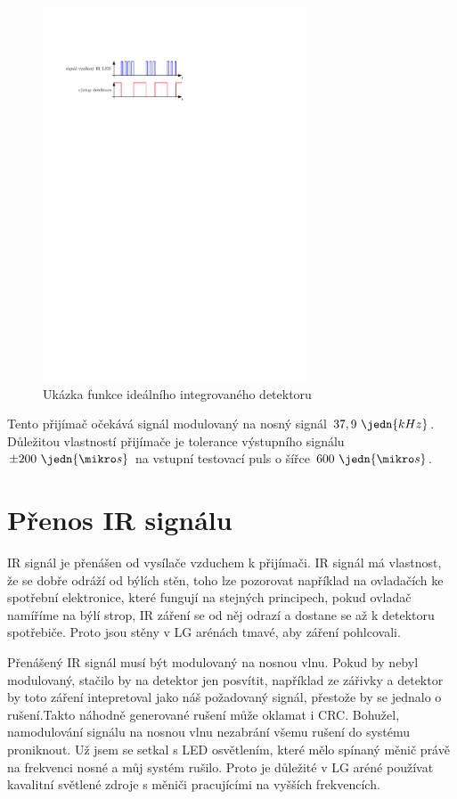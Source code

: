 \begin{figure}[H]
    \begin{center}
        \includegraphics[width=0.7\textwidth]{img/funkce-ir-detektoru}
    \end{center}
    \caption{Ukázka funkce ideálního integrovaného detektoru}
\end{figure}

Tento přijímač očekává signál modulovaný na nosný signál $37,9~\jedn{kHz}$. Důležitou vlastností přijímače je tolerance výstupního signálu $\pm 200~\jedn{\mikro s}$ na vstupní testovací puls o šířce $600~\jedn{\mikro s}$.

\section{Přenos IR signálu}
IR signál je přenášen od vysílače vzduchem k přijímači. IR signál má vlastnost, že se dobře odráží od býlích stěn, toho lze pozorovat například na ovladačích ke spotřební elektronice, které fungují na stejných principech, pokud ovladač namíříme na býlí strop, IR záření se od něj odrazí a dostane se až k detektoru spotřebiče. Proto jsou stěny v LG arénách tmavé, aby záření pohlcovali.

Přenášený IR signál musí být modulovaný na nosnou vlnu. Pokud by nebyl modulovaný, stačilo by na detektor jen posvítit, například ze zářivky a detektor by toto záření intepretoval jako náš požadovaný signál, přestože by se jednalo o rušení.Takto náhodně generované rušení může oklamat i CRC. Bohužel, namodulování signálu na nosnou vlnu nezabrání všemu rušení do systému proniknout. Už jsem se setkal s LED osvětlením, které mělo spínaný měnič právě na frekvenci nosné a můj systém rušilo. Proto je důležité v LG aréné používat kavalitní světlené zdroje s měniči pracujícími na vyšších frekvencích.

